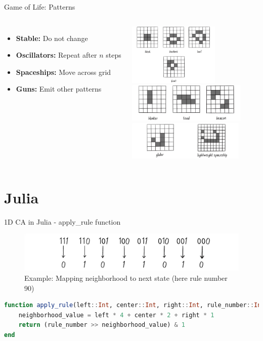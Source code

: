 \begin{frame}{Game of Life: Patterns}
    \begin{columns}
        \begin{itemize}
            \item \textbf{Stable:} Do not change
            \item \textbf{Oscillators:} Repeat after $n$ steps
            \item \textbf{Spaceships:} Move across grid
            \item \textbf{Guns:} Emit other patterns
        \end{itemize}
        \centering
        \includegraphics[height=8em]{../paper/figures/stable}\\
        \includegraphics[height=5em]{../paper/figures/oscillator}\\
        \includegraphics[height=5em]{../paper/figures/spaceship}

    \end{columns}
\end{frame}


\section{Julia}
\begin{frame}[fragile]{1D CA in Julia - apply\_rule function}
    \begin{figure}
        \centering
        \includegraphics[width=\textwidth]{../paper/figures/ruleset_example.png}
        \caption{Example: Mapping neighborhood to next state (here rule number 90)}
    \end{figure}
    \begin{lstlisting}[language=Julia, caption={apply\_rule function for 1D CA}, basicstyle=\ttfamily\scriptsize]
function apply_rule(left::Int, center::Int, right::Int, rule_number::Int)::Int
    neighborhood_value = left * 4 + center * 2 + right * 1
    return (rule_number >> neighborhood_value) & 1
end
\end{lstlisting}
\end{frame}

